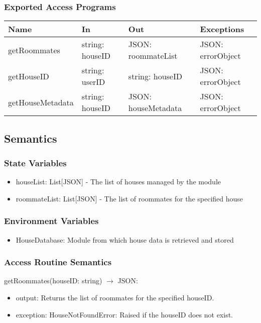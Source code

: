 \documentclass[12pt, titlepage]{article}
\begin{document}
\subsubsection{Exported Access Programs}

\begin{center}
\begin{tabular}{p{3cm} p{4cm} p{5cm} p{3.5cm}}
\hline
\textbf{Name} & \textbf{In} & \textbf{Out} & \textbf{Exceptions} \\
\hline
getRoommates & string: houseID & JSON: roommateList & JSON: errorObject \\
getHouseID & string: userID & string: houseID & JSON: errorObject \\
getHouseMetadata & string: houseID & JSON: houseMetadata & JSON: errorObject \\
\hline
\end{tabular}
\end{center}

\subsection{Semantics}

\subsubsection{State Variables}
\begin{itemize}
  \item houseList: List[JSON] - The list of houses managed by the module
  \item roommateList: List[JSON] - The list of roommates for the specified house
\end{itemize}

\subsubsection{Environment Variables}

\begin{itemize}
  \item HouseDatabase: Module from which house data is retrieved and stored
\end{itemize}

\subsubsection{Access Routine Semantics}

\noindent getRoommates(houseID: string) $\rightarrow$ JSON:
\begin{itemize}
\item output: Returns the list of roommates for the specified houseID.
\item exception: HouseNotFoundError: Raised if the houseID does not exist.
\end{itemize}
\end{document}
